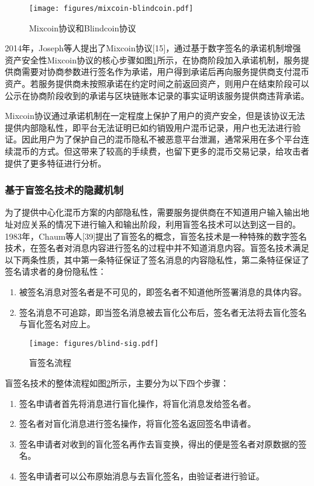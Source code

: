 \begin{figure}[H]
\centering
\texttt{[image: figures/mixcoin-blindcoin.pdf]}
\caption{Mixcoin协议和Blindcoin协议}
\label{fig:mixcoin-blindcoin}
\end{figure}

2014年，Joseph等人提出了Mixcoin协议[15]，通过基于数字签名的承诺机制增强资产安全性Mixcoin协议的核心步骤如图\ref{fig:mixcoin-blindcoin}所示，在协商阶段加入承诺机制，服务提供商需要对协商参数进行签名作为承诺，用户得到承诺后再向服务提供商支付混币资产。若服务提供商未按照承诺在约定时间之前返回资产，则用户在结束阶段可以公示在协商阶段收到的承诺与区块链账本记录的事实证明该服务提供商违背承诺。
	
Mixcoin协议通过承诺机制在一定程度上保护了用户的资产安全，但是该协议无法提供内部隐私性，即平台无法证明已如约销毁用户混币记录，用户也无法进行验证。因此用户为了保护自己的混币隐私不被恶意平台泄漏，通常采用在多个平台连续混币的方式。但这带来了较高的手续费，也留下更多的混币交易记录，给攻击者提供了更多特征进行分析。

\subsubsection{基于盲签名技术的隐藏机制}
为了提供中心化混币方案的内部隐私性，需要服务提供商在不知道用户输入输出地址对应关系的情况下进行输入和输出阶段，利用盲签名技术可以达到这一目的。1983年，Chaum等人[39]提出了盲签名的概念，盲签名技术是一种特殊的数字签名技术，在签名者对消息内容进行签名的过程中并不知道消息内容。盲签名技术满足以下两条性质，其中第一条特征保证了签名消息的内容隐私性，第二条特征保证了签名请求者的身份隐私性：
\begin{enumerate}
	\item 被签名消息对签名者是不可见的，即签名者不知道他所签署消息的具体内容。
	\item 签名消息不可追踪，即当签名消息被去盲化公布后，签名者无法将去盲化签名与盲化签名对应上。
\end{enumerate}

\begin{figure}
\centering
\texttt{[image: figures/blind-sig.pdf]}
\caption{盲签名流程}
\label{fig:blind-sig}
\end{figure}

盲签名技术的整体流程如图\ref{fig:blind-sig}所示，主要分为以下四个步骤：

\begin{enumerate}
	\item 签名申请者首先将消息进行盲化操作，将盲化消息发给签名者。
	\item 签名者对盲化消息进行签名操作，将盲化签名返回签名申请者。
	\item 签名申请者对收到的盲化签名再作去盲变换，得出的便是签名者对原数据的签名。
	\item 签名申请者可以公布原始消息与去盲化签名，由验证者进行验证。
\end{enumerate}

